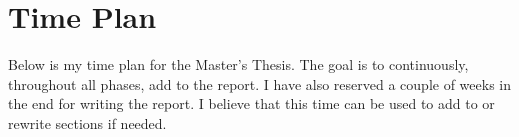 \documentclass{../kththesis}
\begin{document}
	
	\section{Time Plan}
	Below is my time plan for the Master’s Thesis. The goal is to continuously, throughout all phases, add to the report. I have also reserved a couple of weeks in the end for writing the report. I believe that this time can be used to add to or rewrite sections if needed. \\ \\
	
	\begin{ganttchart}{1}{20}
		 \\
		\\
		 \\
		 \\
		 \\
		 \\
		 \\
		 \\
	\end{ganttchart}
	
	\printbibliography[heading=bibintoc] %
	
	
\end{document}
